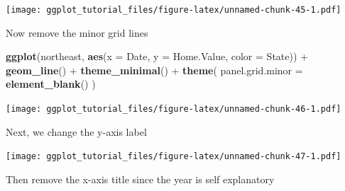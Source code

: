 \documentclass[]{article}
\newenvironment{Shaded}{\begin{snugshade}}{\end{snugshade}}
\newcommand{\KeywordTok}[1]{\textcolor[rgb]{0.13,0.29,0.53}{\textbf{{#1}}}}
\newcommand{\DataTypeTok}[1]{\textcolor[rgb]{0.13,0.29,0.53}{{#1}}}
\newcommand{\StringTok}[1]{\textcolor[rgb]{0.31,0.60,0.02}{{#1}}}
\newcommand{\NormalTok}[1]{{#1}}
\theoremstyle{definition}
\theoremstyle{definition}
\theoremstyle{definition}
\theoremstyle{remark}
\begin{document}
\texttt{[image: ggplot\_tutorial\_files/figure-latex/unnamed-chunk-45-1.pdf]}

Now remove the minor grid lines

\begin{Shaded}
\begin{Highlighting}[]
\KeywordTok{ggplot}\NormalTok{(northeast, }\KeywordTok{aes}\NormalTok{(}\DataTypeTok{x =} \NormalTok{Date, }\DataTypeTok{y =} \NormalTok{Home.Value, }\DataTypeTok{color =} \NormalTok{State)) +}
\StringTok{  }\KeywordTok{geom_line}\NormalTok{() +}
\StringTok{  }\KeywordTok{theme_minimal}\NormalTok{() +}
\StringTok{  }\KeywordTok{theme}\NormalTok{(}
    \DataTypeTok{panel.grid.minor =} \KeywordTok{element_blank}\NormalTok{()}
  \NormalTok{)}
\end{Highlighting}
\end{Shaded}

\texttt{[image: ggplot\_tutorial\_files/figure-latex/unnamed-chunk-46-1.pdf]}

Next, we change the y-axis label

\begin{Shaded}
\end{Shaded}

\texttt{[image: ggplot\_tutorial\_files/figure-latex/unnamed-chunk-47-1.pdf]}

Then remove the x-axis title since the year is self explanatory

\begin{Shaded}
\end{Shaded}
\end{document}

